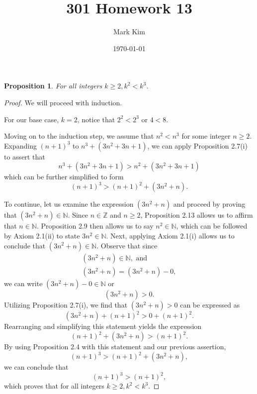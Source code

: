 \documentclass[12pt]{amsart}
\title{301 Homework 13}
\author{Mark Kim}
\date{\today}
\newcommand{\Z}{\mathbb{Z}}
\newcommand{\N}{\mathbb{N}}
\newtheorem*{proposition}{Proposition}
\begin{document}
\maketitle

\begin{proposition}
For all integers $k\geq2, k^2<k^3$.
\end{proposition}

\begin{proof}
We will proceed with induction.

For our base case, $k = 2$, notice that $2^2 < 2^3$ or $4 < 8$.

Moving on to the induction step, we assume that $n^2 < n^3$ for some integer $n\geq2$.  Expanding $(n+1)^3$ to $n^3 + (3n^2 + 3n + 1)$, we can apply Proposition 2.7(i) to assert that
\[ n^3 + (3n^2 + 3n + 1) > n^2 + (3n^2 + 3n + 1)\]
which can be further simplified to form
\[(n+1)^3 > (n+1)^2 + (3n^2 + n).\]

To continue, let us examine the expression $(3n^2 + n)$ and proceed by proving that $(3n^2 + n)\in\N$.  Since $n\in\Z$ and $n\geq2$, Proposition 2.13 allows us to affirm that $n\in\N$.  Proposition 2.9 then allows us to say $n^2\in\N$, which can be followed by Axiom 2.1(ii) to state $3n^2\in\N$.  Next, applying Axiom 2.1(i) allows us to conclude that $(3n^2 + n)\in\N$.  Observe that since
\begin{align*}
(3n^2 + n)\in\N,\text{ and}\\
(3n^2 + n) = (3n^2 + n) - 0,
\end{align*}
we can write $(3n^2 + n) - 0\in\N$ or \[(3n^2 + n) > 0.\]
Utilizing Proposition 2.7(i), we find that $(3n^2 + n) > 0$ can be expressed as
\[(3n^2 + n) + (n+1)^2 > 0 + (n+1)^2.\]
Rearranging and simplifying this statement yields the expression
\[(n+1)^2 + (3n^2 + n) > (n+1)^2.\]
By using Proposition 2.4 with this statement and our previous assertion,
\[(n+1)^3 > (n+1)^2 + (3n^2 + n),\]
we can conclude that
\[(n+1)^3 > (n+1)^2,\]
which proves that for all integers $k\geq2, k^2<k^3$.
\end{proof}
\end{document}
